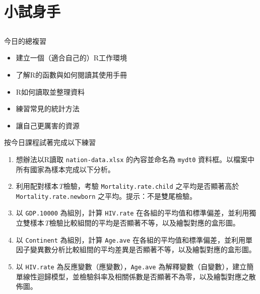 \documentclass[12pt, aspectratio=43]{beamer}
\begin{document}
\section{小試身手}\subsection{}

\begin{frame}{今日的總複習}
\begin{itemize}
\item 建立一個（適合自己的）R工作環境
\item 了解R的函數與如何閱讀其使用手冊
\item R如何讀取並整理資料
\item 練習常見的統計方法
\item 讓自己更厲害的資源
\end{itemize}
\end{frame}


\begin{frame}[shrink=8, fragile]{按今日課程試著完成以下練習}
\begin{enumerate}
\item 想辦法以R讀取 \verb+nation-data.xlsx+ 的內容並命名為 \verb+mydt0+ 資料框。以檔案中所有國家為樣本完成以下分析。
\item 利用配對樣本\emph{T}檢驗，考驗 \verb+Mortality.rate.child+ 之平均是否顯著高於 \verb+Mortality.rate.newborn+ 之平均。提示：不是雙尾檢驗。
\item 以 \verb+GDP.10000+ 為組別，計算 \verb+HIV.rate+ 在各組的平均值和標準偏差，並利用獨立雙樣本\emph{T}檢驗比較組間的平均是否顯著不等，以及繪製對應的盒形圖。
\item 以 \verb+Continent+ 為組別，計算 \verb+Age.ave+ 在各組的平均值和標準偏差，並利用單因子變異數分析比較組間的平均差異是否顯著不等，以及繪製對應的盒形圖。
\item 以 \verb+HIV.rate+ 為反應變數（應變數），\verb+Age.ave+ 為解釋變數（自變數），建立簡單線性迴歸模型，並檢驗斜率及相關係數是否顯著不為零，以及繪製對應之散佈圖。
\end{enumerate}
\end{frame}
\end{document}
